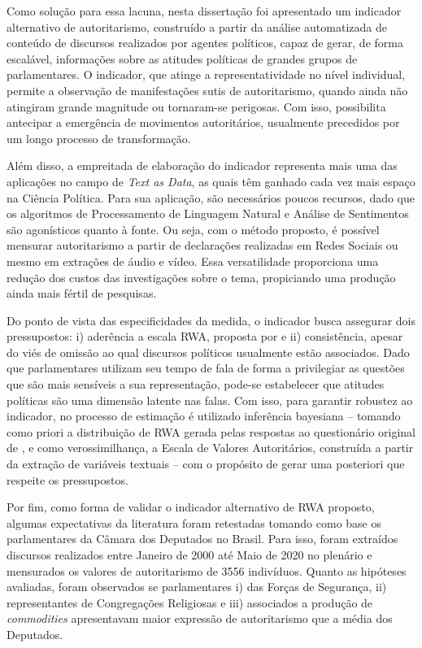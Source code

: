 \documentclass[
12pt,				%
openright,			%
twoside,			%
a4paper,			%
english,			%
french,				%
spanish,			%
brazil				%
]{abntex2}
\begin{document}
Como solução para essa lacuna, nesta dissertação foi apresentado um indicador alternativo de autoritarismo, construído a partir da análise automatizada de conteúdo de discursos realizados por agentes políticos, capaz de gerar, de forma escalável, informações sobre as atitudes políticas de grandes grupos de parlamentares. O indicador, que atinge a representatividade no nível individual, permite a observação de manifestações sutis de autoritarismo, quando ainda não atingiram grande magnitude ou tornaram-se perigosas. Com isso, possibilita antecipar a emergência de movimentos autoritários, usualmente precedidos por um longo processo de transformação.  

Além disso, a empreitada de elaboração do indicador representa mais uma das aplicações no campo de \emph{Text as Data}, as quais têm ganhado cada vez mais espaço na Ciência Política. Para sua aplicação, são necessários poucos recursos, dado que os algoritmos de Processamento de Linguagem Natural e Análise de Sentimentos são agonísticos quanto à fonte. Ou seja, com o método proposto, é possível mensurar autoritarismo a partir de declarações realizadas em Redes Sociais ou mesmo em extrações de áudio e vídeo. Essa versatilidade proporciona uma redução dos custos das investigações sobre o tema, propiciando uma produção ainda mais fértil de pesquisas. 

Do ponto de vista das especificidades da medida, o indicador busca assegurar dois pressupostos: i) aderência a escala RWA, proposta por  e ii) consistência, apesar do viés de omissão ao qual discursos políticos usualmente estão associados. Dado que parlamentares utilizam seu tempo de fala de forma a privilegiar as questões que são mais sensíveis a sua representação, pode-se estabelecer que atitudes políticas são uma dimensão latente nas falas. Com isso, para garantir robustez ao indicador, no processo de estimação é utilizado inferência bayesiana -- tomando como priori a distribuição de RWA gerada pelas respostas ao questionário original de , e como verossimilhança, a Escala de Valores Autoritários, construída a partir da extração de variáveis textuais -- com o propósito de gerar uma posteriori que respeite os pressupostos.

Por fim, como forma de validar o indicador alternativo de RWA proposto, algumas expectativas da literatura foram retestadas tomando como base os parlamentares da Câmara dos Deputados no Brasil. Para isso, foram extraídos discursos realizados entre Janeiro de 2000 até Maio de 2020 no plenário e mensurados os valores de autoritarismo de 3556 indivíduos. Quanto as hipóteses avaliadas, foram observados se parlamentares i) das Forças de Segurança, ii) representantes de Congregações Religiosas e iii) associados a produção de \emph{commodities} apresentavam maior expressão de autoritarismo que a média dos Deputados.
\end{document}
